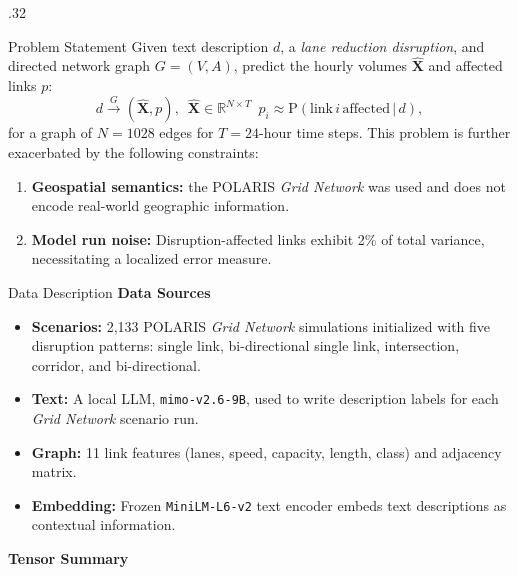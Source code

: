 \documentclass[final]{beamer}
\begin{document}
\begin{frame}[t]
\begin{columns}[t,onlytextwidth]
\begin{column}{.32\textwidth}
      \begin{chbox}{Problem Statement}
        Given text description $d$, a \textit{lane reduction disruption}, and directed network graph $G=(V,A)$, predict the hourly volumes $\hat{\mathbf{X}}$ and affected links $p$:
        \[
          d \overset{\textit{G}}{\rightarrow}(\hat{\mathbf{X}}, p), \enspace \hat{\mathbf{X}}\in\mathbb{R}^{N\times T} \enspace p_i \approx \mathrm{P}(\mathrm{link}\, i \, \mathrm{affected}\,\vert\,d),
        \]
        for a graph of $N=1028$ edges for $T=24$-hour time steps. This problem is further exacerbated by the following constraints:
        \begin{enumerate}
          \item \textbf{Geospatial semantics:} the POLARIS \textit{Grid Network} was used and does not encode real-world geographic information.
          \item \textbf{Model run noise:} Disruption-affected links exhibit 2\% of total variance, necessitating a localized error measure.
        \end{enumerate}
        
      \end{chbox}

      \begin{chbox}[stretch]{Data Description}
        \textbf{Data Sources}
        \begin{itemize}
          \item \textbf{Scenarios:} 2{,}133 POLARIS \textit{Grid Network} simulations initialized with five disruption patterns: single link, bi-directional single link, intersection, corridor, and bi-directional.
          \item \textbf{Text:} A local LLM, \texttt{mimo-v2.6-9B}, used to write description labels for each \textit{Grid Network} scenario run.
          \item \textbf{Graph:} 11 link features (lanes, speed, capacity, length, class) and adjacency matrix.
          \item \textbf{Embedding:} Frozen \texttt{MiniLM-L6-v2} text encoder embeds text descriptions as contextual information.
        \end{itemize}

        \textbf{Tensor Summary}


\end{chbox}
\end{column}
\end{columns}
\end{frame}
\end{document}
